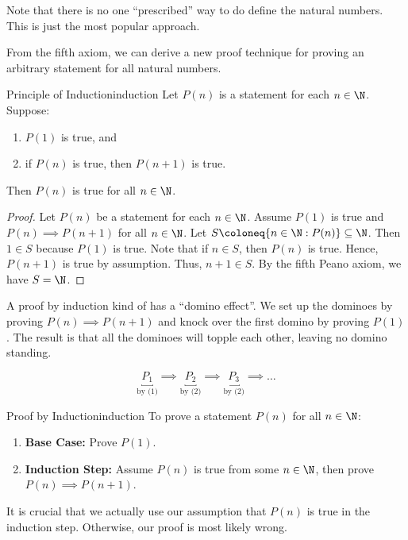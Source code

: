\documentclass[12pt]{report}
\begin{document}
\begin{notebox}
    Note that there is no one ``prescribed'' way to do define the natural numbers. This is just the most popular approach.
\end{notebox}

From the fifth axiom, we can derive a new proof technique for proving an arbitrary statement for all natural numbers.

\begin{thmbox}{Principle of Induction}{induction}
    Let $P(n)$ is a statement for each $n \in \N$. Suppose:
    \begin{enumerate}
        \item $P(1)$ is true, and
        \item if $P(n)$ is true, then $P(n+1)$ is true.
    \end{enumerate}
    Then $P(n)$ is true for all $n \in \N$.
    \tcblower
    \begin{proof}
        Let $P(n)$ be a statement for each $n \in \N$. Assume $P(1)$ is true and $P(n) \implies P(n+1)$ for all $n \in \N$. Let $S \coloneq \{ n \in \N : P(n) \} \subseteq \N$. Then $1 \in S$ because $P(1)$ is true. Note that if $n \in S$, then $P(n)$ is true. Hence, $P(n+1)$ is true by assumption. Thus, $n+1 \in S$. By the fifth Peano axiom, we have $S = \N$.
    \end{proof}
\end{thmbox}

A proof by induction kind of has a ``domino effect''. We set up the dominoes by proving $P(n) \implies P(n+1)$ and knock over the first domino by proving $P(1)$. The result is that all the dominoes will topple each other, leaving no domino standing.

\[ \underbracket{P_1}_{\text{by (1)}} \implies \underbracket{P_2}_{\text{by (2)}} \implies \underbracket{P_3}_{\text{by (2)}} \implies \ldots \]

\begin{tecbox}{Proof by Induction}{induction}
    To prove a statement $P(n)$ for all $n \in \N$:
    \begin{enumerate}
        \item \textbf{Base Case:} Prove $P(1)$.
        \item \textbf{Induction Step:} Assume $P(n)$ is true from some $n \in \N$, then prove $P(n) \implies P(n+1)$.
    \end{enumerate}
\end{tecbox}

It is crucial that we actually use our assumption that $P(n)$ is true in the induction step. Otherwise, our proof is most likely wrong.
\end{document}

